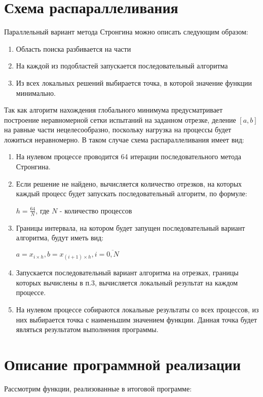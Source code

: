 \documentclass{report}
\begin{document}
\section*{Схема распараллеливания}
Параллельный вариант метода Стронгина можно описать следующим образом:
\begin{enumerate}
\item Область поиска разбивается на части
\item На каждой из подобластей запускается последовательный алгоритма
\item Из всех локальных решений выбирается точка, в которой значение функции минимально.
\end{enumerate}
\par Так как алгоритм нахождения глобального минимума предусматривает построение неравномерной сетки испытаний на заданном отрезке, деление $[a,b]$ на равные части нецелесообразно, поскольку нагрузка на процессы будет ложиться неравномерно. В таком случае схема распараллеливания имеет вид:\par
\begin{enumerate}
	\item На нулевом процессе проводится 64 итерации последовательного метода Стронгина.
	\item Если решение не найдено, вычисляется количество отрезков, на которых каждый процесс будет запускать последовательный алгоритм, по формуле:\par
	$h = \frac{64}{N}$, где $N$ - количество процессов
	\item Границы интервала, на котором будет запущен последовательный вариант алгоритма, будут иметь вид:\par
	$a = x_{i\times{}h}, b = x_{(i+1)\times{}h}, i = \overline{0,N} $
	\item Запускается последовательный вариант алгоритма на отрезках, границы которых вычислены в п.3, вычисляется локальный результат на каждом процессе.
	\item На нулевом процессе собираются локальные результаты со всех процессов, из них выбирается точка с наименьшим значением функции. Данная точка будет являться результатом выполнения программы.
\end{enumerate}
\newpage

\section*{Описание программной реализации}
Рассмотрим функции, реализованные в итоговой программе:\par
\end{document}
